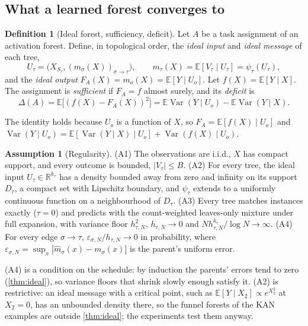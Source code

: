 \documentclass[11pt]{article}
\theoremstyle{definition}
\newtheorem{definition}[theorem]{Definition}
\newtheorem{assumption}[theorem]{Assumption}
\theoremstyle{remark}
\newcommand{\R}{\mathbb{R}}
\newcommand{\E}{\mathbb{E}}
\newcommand{\Var}{\operatorname{Var}}
\begin{document}
\subsection{What a learned forest converges to}

\begin{definition}[Ideal forest, sufficiency, deficit]\label{def:ideal}
Let $A$ be a task assignment of an activation forest.  Define, in topological order,
the \emph{ideal input} and \emph{ideal message} of each tree,
\[
  U_\tau=\bigl(X_{S_\tau},(m_\sigma(X))_{\sigma\to\tau}\bigr),\qquad
  m_\tau(X)=\E[V_\tau\mid U_\tau]=\psi_\tau(U_\tau),
\]
and the \emph{ideal output} $F_A(X)=m_o(X)=\E[Y\mid U_o]$.  Let $f(X)=\E[Y\mid X]$.  The
assignment is \emph{sufficient} if $F_A=f$ almost surely, and its \emph{deficit} is
\[
  \Delta(A)=\E\bigl[(f(X)-F_A(X))^2\bigr]=\E\Var(Y\mid U_o)-\E\Var(Y\mid X).
\]
\end{definition}

The identity holds because $U_o$ is a function of $X$, so $F_A=\E[f(X)\mid U_o]$ and
$\Var(Y\mid U_o)=\E[\Var(Y\mid X)\mid U_o]+\Var(f(X)\mid U_o)$.

\begin{assumption}[Regularity]\label{ass:regular}
(A1) The observations are i.i.d., $X$ has compact support, and every outcome is
bounded, $|V_\tau|\le B$.  (A2) For every tree, the ideal input
$U_\tau\in\R^{k_\tau}$ has a density bounded away from zero and infinity on its support
$D_\tau$, a compact set with Lipschitz boundary, and $\psi_\tau$ extends to a uniformly
continuous function on a neighbourhood of $D_\tau$.  (A3) Every tree matches instances exactly
($\tau=0$) and predicts with the count-weighted leaves-only mixture under full expansion,
with variance floor $h_{\tau,N}^2$, $h_{\tau,N}\to0$ and
$Nh_{\tau,N}^{k_\tau}/\log N\to\infty$.  (A4) For every edge $\sigma\to\tau$,
$\varepsilon_{\sigma,N}/h_{\tau,N}\to0$ in probability, where
$\varepsilon_{\sigma,N}=\sup_x|\hat m_\sigma(x)-m_\sigma(x)|$ is the parent's uniform
error.
\end{assumption}

(A4) is a condition on the schedule: by induction the parents' errors tend to zero
(\cref{thm:ideal}), so variance floors that shrink slowly enough satisfy it.  (A2) is
restrictive: an ideal message with a critical point, such as $\E[Y\mid X_2]\propto
e^{X_2^2}$ at $X_2=0$, has an unbounded density there, so the funnel forests of the KAN
examples are outside \cref{thm:ideal}; the experiments test them anyway.
\end{document}
